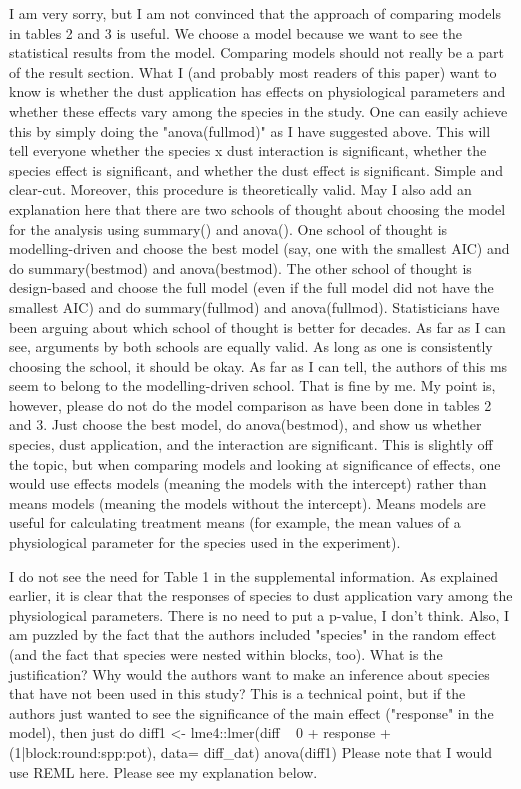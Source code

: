 \documentclass[parskip=half]{scrartcl}
\begin{document}
I am very sorry, but I am not convinced that the approach of comparing models in tables 2 and 3 is useful.
We choose a model because we want to see the statistical results from the model.  Comparing models should not really be a part of the result section.
What I (and probably most readers of this paper) want to know is whether the dust application has effects on physiological parameters and whether these effects vary among the species in the study.  One can easily achieve this by simply doing the "anova(fullmod)" as I have suggested above.
This will tell everyone whether the species x dust interaction is significant, whether the species effect is significant, and whether the dust effect is significant.  Simple and clear-cut.  Moreover, this procedure is theoretically valid.
May I also add an explanation here that there are two schools of thought about choosing the model for the analysis using summary() and anova().  One school of thought is modelling-driven and choose the best model (say, one with the smallest AIC) and do summary(bestmod) and anova(bestmod).  The other school of thought is design-based and choose the full model (even if the full model did not have the smallest AIC) and do summary(fullmod) and anova(fullmod).  Statisticians have been arguing about which school of thought is better for decades.  As far as I can see, arguments by both schools are equally valid. As long as one is consistently choosing the school, it should be okay.  As far as I can tell, the authors of this ms seem to belong to the modelling-driven school. That is fine by me. My point is, however, please do not do the model comparison as have been done in tables 2 and 3. Just choose the best model, do anova(bestmod), and show us whether species, dust application,
and the interaction are significant.
This is slightly off the topic, but when comparing models and looking at significance of effects, one would use effects models (meaning the models with the intercept) rather than means models (meaning the models without the intercept).  Means models are useful for calculating treatment means (for example, the mean values of a physiological parameter for the species used in the experiment).

I do not see the need for Table 1 in the supplemental information.
As explained earlier, it is clear that the responses of species to dust application vary among the physiological parameters.  There is no need to put a p-value, I don't think.
Also, I am puzzled by the fact that the authors included "species" in the random effect (and the fact that species were nested within blocks, too).  What is the justification?  Why would the authors want to make an inference about species that have not been used in this study?
This is a technical point, but if the authors just wanted to see the significance of the main effect ("response" in the model), then just do
diff1 <- lme4::lmer(diff ~ 0 + response + (1|block:round:spp:pot), data= diff\_dat)
anova(diff1)
Please note that I would use REML here.  Please see my explanation below.
\end{document}

